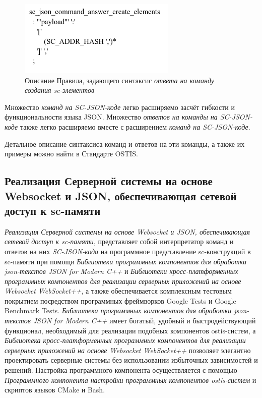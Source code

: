 \begin{figure}[htbp]
	\center
	\includegraphics[scale=0.8]{author/part6/figures/create_elements_command_answer.png}
	\caption{Описание Правила, задающего синтаксис \textit{ответа на команду создания sc-элементов}}
	\label{fig:create_elements_command_answer}
\end{figure}

Множество \textit{команд на SC-JSON-коде} легко расширяемо засчёт гибкости и функциональности языка JSON. Множество \textit{ответов на команды на SC-JSON-коде} также легко расширяемо вместе с расширением \textit{команд на SC-JSON-коде}.

Детальное описание синтаксиса команд и ответов на эти команды, а также их примеры можно найти в Стандарте OSTIS.

\subsection{Реализация Серверной системы на основе Websocket и JSON, обеспечивающая сетевой доступ к sc-памяти}
\label{sec_soft_platform_sc_server}

\textit{Реализация Серверной системы на основе Websocket и JSON, обеспечивающая сетевой доступ к sc-памяти}, представляет собой интерпретатор команд и ответов на них \textit{SC-JSON-кода} на программное представление sc-конструкций в sc-памяти при помощи \textit{Библиотеки программных компонентов для обработки json-текстов JSON for Modern C++} и \textit{Библиотеки кросс-платформенных программных компонентов для реализации серверных приложений на основе Websocket WebSocket++}, а также обеспечивается комплексным тестовым покрытием посредством программных фреймворков Google Tests и Google Benchmark Tests. \textit{Библиотека программных компонентов для обработки json-текстов JSON for Modern C++} имеет богатый, удобный и быстродействующий функционал, необходимый для реализации подобных компонентов ostis-систем, а \textit{Библиотека кросс-платформенных программных компонентов для реализации серверных приложений на основе Websocket WebSocket++} позволяет элегантно проектировать серверные системы без использовании избыточных зависимостей и решений. Настройка программного компонента осуществляется с помощью \textit{Программного компонента настройки программных компонентов ostis-систем} и скриптов языков CMake и Bash.

